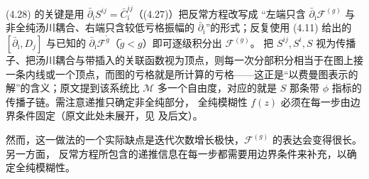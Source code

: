 \begin{yizhu}[物理图像]
(4.28) 的关键是用 $\bar\partial_{\bar\imath}S^{ij}=\bar C^{ij}_{\bar\imath}$（(4.27)）把反常方程改写成
“左端只含 $\bar\partial_{\bar\imath}\mathcal{F}^{(g)}$ 与非全纯汤川耦合、右端只含较低亏格振幅的
$\bar\partial_{\bar\imath}$”的形式；反复使用 (4.11) 给出的 $[\bar\partial_{\bar\imath},D_j]$ 与已知的
$\bar\partial_{\bar\imath}\mathcal{F}^{\tilde g}$（$\tilde g<g$）即可逐级积分出 $\mathcal{F}^{(g)}$。
把 $S^{ij},S^i,S$ 视为传播子、把汤川耦合与带插入的关联函数视为顶点，则每一次分部积分相当于在图上接
一条内线或一个顶点，而图的亏格就是所计算的亏格——这正是“以费曼图表示的解”的含义；原文提到该系统比
$\mathcal{M}$ 多一个自由度，对应的就是 $S$ 那条带 $\phi$ 指标的传播子链。需注意递推只确定非全纯部分，
全纯模糊性 $f(z)$ 必须在每一步由边界条件固定（原文此处未展开，见 \cite{ref19} 及后文）。
\end{yizhu}

然而，这一做法的一个实际缺点是迭代次数增长极快，$\mathcal{F}^{(g)}$ 的表达会变得很长。另一方面，
反常方程所包含的递推信息在每一步都需要用边界条件来补充，以确定全纯模糊性。
